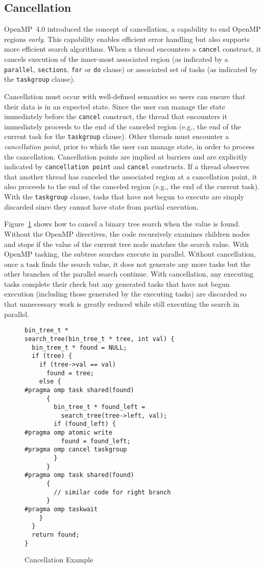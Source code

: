 \subsection{Cancellation}
\label{sec:Cancellation}
OpenMP~4.0 introduced the concept of cancellation, a capability to end 
OpenMP regions \emph{early}. This capability enables efficient error
handling but also supports more efficient search algorithms. When a thread
encounters a \texttt{cancel} construct, it cancels execution of the 
inner-most associated region (as indicated by a \texttt{parallel}, 
\texttt{sections}, \texttt{for} or \texttt{do} clause) or associated set 
of tasks (as indicated by the \texttt{taskgroup} clause). 

Cancellation must occur with well-defined semantics so users can ensure 
that their data is in an expected state. Since the user can manage the 
state immediately before the \texttt{cancel} construct, the thread 
that encounters it immediately proceeds to the end of the canceled region 
(e.g., the end of the current task for the \texttt{taskgroup} clause). Other
threads must encounter a \emph{cancellation point}, prior to which the user 
can manage state, in order to process the cancellation. Cancellation points 
are implied at barriers and are explicitly indicated by 
\texttt{cancellation point} and \texttt{cancel} constructs. If a thread 
observes that another thread has canceled the associated region at a 
cancellation point, it also proceeds to the end of the canceled region 
(e.g., the end of the current task). With the \texttt{taskgroup} clause, 
tasks that have not begun to execute are simply discarded since they cannot 
have state from partial execution.

Figure~\ref{fig:Cancellation} shows how to cancel a binary tree search when 
the value is found. Without the OpenMP directives, the code recursively 
examines children nodes and stops if the value of the current tree node 
matches the search value. With OpenMP tasking, the subtree searches execute
in parallel. Without cancellation, once a task finds the search value, it does
not generate any more tasks but the other branches of the parallel search 
continue. With cancellation, any executing tasks complete their check but 
any generated tasks that have not begun execution (including those 
generated by the executing tasks) are discarded so that unnecessary work 
is greatly reduced while still executing the search in parallel.

\begin{figure}
\begin{verbatim}
bin_tree_t *
search_tree(bin_tree_t * tree, int val) {
  bin_tree_t * found = NULL;
  if (tree) {
    if (tree->val == val)
      found = tree;
    else {
#pragma omp task shared(found)
      {
        bin_tree_t * found_left =
          search_tree(tree->left, val);
        if (found_left) {
#pragma omp atomic write
          found = found_left;
#pragma omp cancel taskgroup
        }
      }
#pragma omp task shared(found)
      {
        // similar code for right branch
      }
#pragma omp taskwait
    }
  }
  return found;
}
\end{verbatim}
\caption{Cancellation Example\label{fig:Cancellation}}
\end{figure}


